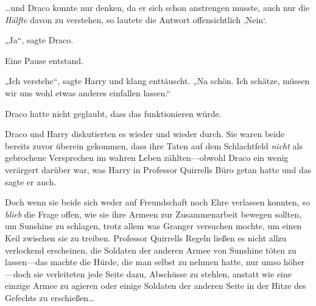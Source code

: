 …und Draco konnte nur denken, da er sich schon anstrengen musste, auch nur die \emph{Hälfte} davon zu verstehen, so lautete die Antwort offensichtlich ‚Nein‘.

„Ja“, sagte Draco.

Eine Pause entstand.

„Ich verstehe“, sagte Harry und klang enttäuscht. „Na schön. Ich schätze, müssen wir uns wohl etwas anderes einfallen lassen.“

Draco hatte nicht geglaubt, dass das funktionieren würde.

Draco und Harry diskutierten es wieder und wieder durch. Sie waren beide bereits zuvor überein gekommen, dass ihre Taten auf dem Schlachtfeld \emph{nicht} als gebrochene Versprechen im wahren Leben zählten—obwohl Draco ein wenig verärgert darüber war, was Harry in Professor Quirrells Büro getan hatte und das sagte er auch.

Doch wenn sie beide sich weder auf Freundschaft noch Ehre verlassen konnten, so \emph{blieb} die Frage offen, wie sie ihre Armeen zur Zusammenarbeit bewegen sollten, um Sunshine zu schlagen, trotz allem was Granger versuchen mochte, um einen Keil zwischen sie zu treiben. Professor Quirrells Regeln ließen es nicht allzu verlockend erscheinen, die Soldaten der anderen Armee von Sunshine töten zu lassen—das machte die Hürde, die man selbst zu nehmen hatte, nur umso höher—doch sie verleiteten jede Seite dazu, Abschüsse zu stehlen, anstatt wie eine einzige Armee zu agieren oder einige Soldaten der anderen Seite in der Hitze des Gefechts zu erschießen…

